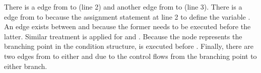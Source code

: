 There is a  edge from  to
 (line 2) and another  edge
from  to  (line 3). There is a
 edge from  to
 because the assignment statement at line 2 to
define the variable . An  edge exists
between  and 
because the former needs to be executed before the latter. Similar
treatment is applied for  and
. Because the  node represents the
branching point in the condition structure,  is
executed before . Finally, there are two  edges
from  to either  and
 due to the control flows from the
branching point to either branch.



